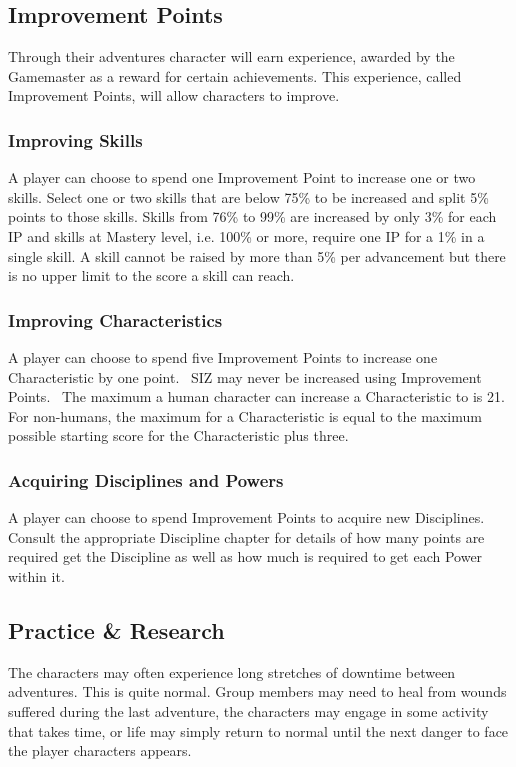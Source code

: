 \subsection{Improvement Points}
\label{ssec:improvement-points}
Through their adventures character will earn experience, awarded by the Gamemaster as a reward for certain achievements. This experience, called Improvement Points, will allow characters to improve.

\subsubsection{Improving Skills}
A player can choose to spend one Improvement Point to increase one or two skills.
Select one or two skills that are below 75\% to be increased and split 5\% points to those skills. Skills from 76\% to 99\% are increased by only 3\% for each IP and skills at Mastery level, i.e. 100\% or more, require one IP for a 1\% in a single skill.
A skill cannot be raised by more than 5\% per advancement but there is no upper limit to the score a skill can reach. 

\subsubsection{Improving Characteristics}
A player can choose to spend five Improvement Points to increase one Characteristic by one point. 
SIZ may never be increased using Improvement Points. 
The maximum a human character can increase a Characteristic to is 21. For non-humans, the maximum for a Characteristic is equal to the maximum possible starting score for the Characteristic plus three.

\subsubsection{Acquiring Disciplines and Powers}
A player can choose to spend Improvement Points to acquire new Disciplines. Consult the appropriate Discipline chapter for details of how many points are required get the Discipline as well as how much is required to get each Power within it.

\subsection{Practice \& Research}
The characters may often experience long stretches of downtime between adventures. This is quite normal. Group members may need to heal from wounds suffered during the last adventure, the characters may engage in some activity that takes time, or life may simply return to normal until the next danger to face the player characters appears.

